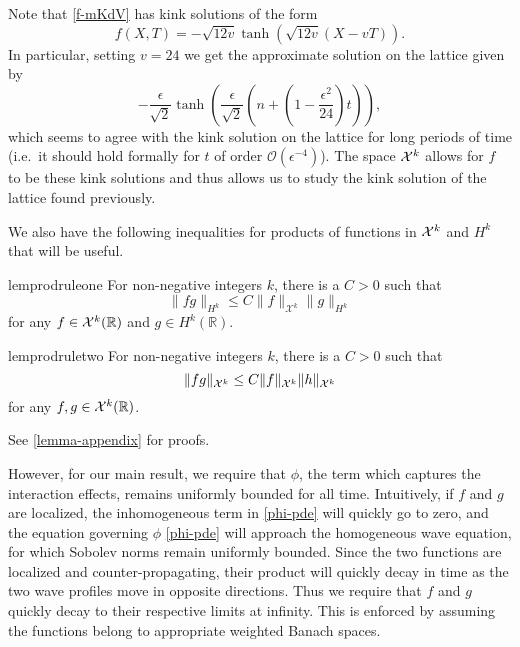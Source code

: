 Note that \cref{f-mKdV} has kink solutions of the form
\begin{equation}\label{kink-solutions}
	f(X,T) = - \sqrt{12 v} \tanh\left( \sqrt{12v} (X-vT)\right).
\end{equation}
In particular, setting \(v = 24\) we get the approximate solution on the lattice given by
\begin{equation}
	- \frac \epsilon {\sqrt 2} \tanh\left(\frac \epsilon {\sqrt 2} \left(n + \left(1-\frac{\epsilon^2} {24}\right) t\right)\right),
\end{equation} which seems to agree with the kink solution on the lattice for long periods of time (i.e.\ it should hold formally for \(t\) of order \(\mathcal O(\epsilon^{-4})\)). The space \(\mathcal{X}^k\) allows for \(f\) to be these kink solutions and thus allows us to study the kink solution of the lattice found previously. 

We also have the following inequalities for products of functions in \(\mathcal{X}^k\) and \(H^k\) that will be useful. 

	
\begin{restatable}{lem}{prodruleone}
	\label{prod-rule-1-lem}
	For non-negative integers \(k\), there is a \(C>0\) such that
	\begin{equation}\label{prod_rule}
		\| fg \|_{H^k} \leq C \| f \|_{\mathcal X^k} \| g \|_{H^k}
	\end{equation}
	for any \(f\in \mathcal{X}^k(\mathbb R)\) and \(g \in H^k(\mathbb R)\).
\end{restatable}

\begin{restatable}{lem}{prodruletwo}
	\label{prod-rule-2-lem}
	For non-negative integers \(k\), there is a \(C>0\) such that
	\begin{equation}\label{prod_rule_2}
		\| fg \|_{\mathcal{X}^k} \leq C \| f \|_{\mathcal{X}^k} \| h \|_{\mathcal{X}^k}
	\end{equation}
	for any \(f,g\in \mathcal{X}^k(\mathbb R)\).
\end{restatable}
See \cref{lemma-appendix} for proofs.

However, for our main result, we require that \(\phi\), the term which captures the interaction effects, remains uniformly bounded for all time. Intuitively, if \(f\) and \(g\) are localized, the inhomogeneous term in \cref{phi-pde} will quickly go to zero, and the equation governing \(\phi\) \cref{phi-pde} will approach the homogeneous wave equation, for which Sobolev norms remain uniformly bounded. Since the two functions are localized and counter-propagating, their product will quickly decay in time as the two wave profiles move in opposite directions. Thus we require that \(f\) and \(g\) quickly decay to their respective limits at infinity. This is enforced by assuming the functions belong to appropriate weighted Banach spaces.

